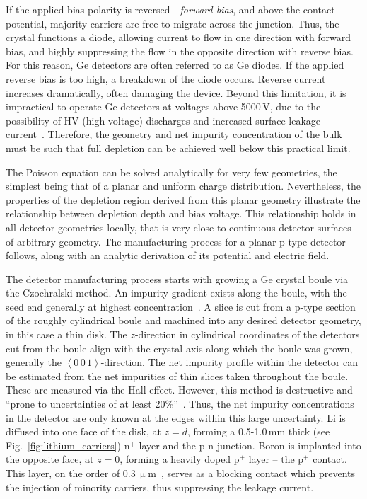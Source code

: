 If the applied bias polarity is reversed - \textit{forward bias}, and above the contact potential, majority carriers are free to migrate across the junction. Thus, the crystal functions a diode, allowing current to flow in one direction with forward bias, and highly suppressing the flow in the opposite direction with reverse bias. For this reason, Ge detectors are often referred to as Ge diodes. If the applied reverse bias is too high, a breakdown of the diode occurs. Reverse current increases dramatically, often damaging the device. Beyond this limitation, it is impractical to operate Ge detectors at voltages above 5000\,V, due to the possibility of HV (high-voltage) discharges and increased surface leakage current~\cite{knoll}. Therefore, the geometry and net impurity concentration of the bulk must be such that full depletion can be achieved well below this practical limit. 

The Poisson equation can be solved analytically for very few geometries, the simplest being that of a planar and uniform charge distribution. Nevertheless, the properties of the depletion region derived from this planar geometry illustrate the relationship between depletion depth and bias voltage. This relationship holds in all detector geometries locally, that is very close to continuous detector surfaces of arbitrary geometry. The manufacturing process for a planar p-type detector follows, along with an analytic derivation of its potential and electric field.

The detector manufacturing process starts with growing a Ge crystal boule via the Czochralski method. An impurity gradient exists along the boule, with the seed end generally at highest concentration~\cite{gefica}. A slice is cut from a p-type section of the roughly cylindrical boule and machined into any desired detector geometry, in this case a thin disk. The $z$-direction in cylindrical coordinates of the detectors cut from the boule align with the crystal axis along which the boule was grown, generally the $\left<0\,0\,1\right>$-direction. The net impurity profile within the detector can be estimated from the net impurities of thin slices taken throughout the boule. These are measured via the Hall effect. However, this method is destructive and ``prone to uncertainties of at least 20\%''~\cite{low_conc_dets}. Thus, the net impurity concentrations in the detector are only known at the edges within this large uncertainty. Li is diffused into one face of the disk, at $z = d$, forming a 0.5-1.0\,mm thick (see Fig.~\ref{fig:lithium_carriers}) n$^+$ layer and the p-n junction. Boron is implanted into the opposite face, at $z = 0$, forming a heavily doped p$^+$ layer -- the p$^+$ contact. This layer, on the order of 0.3\,$\upmu$m~\cite{boron}, serves as a blocking contact which prevents the injection of minority carriers, thus suppressing the leakage current. 

